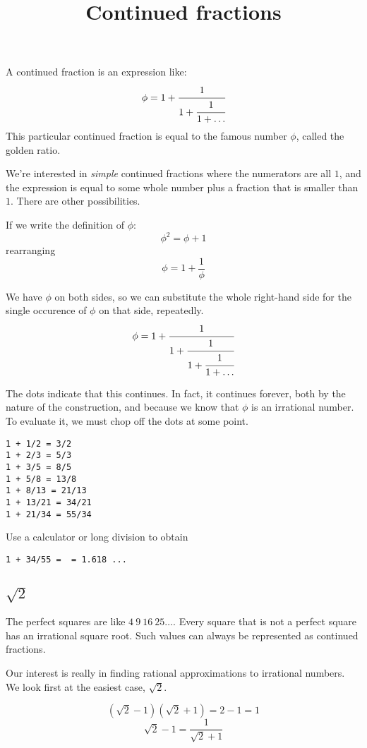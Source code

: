 \documentclass[11pt, oneside]{article}
\title{Continued fractions}
\date{}
\begin{document}
\maketitle
\Large


A continued fraction is an expression like:
\[ \phi = 1 + \cfrac{1}{1 + \cfrac{1}{1 +  \dots}}  \]
This particular continued fraction is equal to the famous number $\phi$, called the golden ratio. 

We're interested in \emph{simple} continued fractions where the numerators are all $1$, and the expression is equal to some whole number plus a fraction that is smaller than $1$.  There are other possibilities.

If we write the definition of $\phi$:
\[ \phi^2 = \phi + 1 \]
rearranging
\[ \phi = 1 + \frac{1}{\phi} \]

We have $\phi$ on both sides, so we can substitute the whole right-hand side for the single occurence of $\phi$ on that side, repeatedly.
\[ \phi = 1 + \cfrac{1}{1 + \cfrac{1}{1 + \cfrac{1}{1 + \dots}}}  \]

The dots indicate that this continues.  In fact, it continues forever, both by the nature of the construction, and because we know that $\phi$ is an irrational number.  To evaluate it, we must chop off the dots at some point.

\begin{verbatim}
1 + 1/2 = 3/2
1 + 2/3 = 5/3
1 + 3/5 = 8/5
1 + 5/8 = 13/8
1 + 8/13 = 21/13
1 + 13/21 = 34/21
1 + 21/34 = 55/34
\end{verbatim}

Use a calculator or long division to obtain

\begin{verbatim}
1 + 34/55 =  = 1.618 ...
\end{verbatim}

\subsection*{$\sqrt{2}$}
The perfect squares are like $4 \ 9 \ 16 \ 25 \dots$.  Every square that is not a perfect square has an irrational square root.  Such values can always be represented as continued fractions.

Our interest is really in finding rational approximations to irrational numbers.  We look first at the easiest case, $\sqrt{2}$.

\[ (\sqrt{2} - 1)(\sqrt{2} + 1) =  2 - 1 = 1 \]
\[ \sqrt{2} - 1 = \frac{1}{\sqrt{2} + 1} \]
\end{document}
